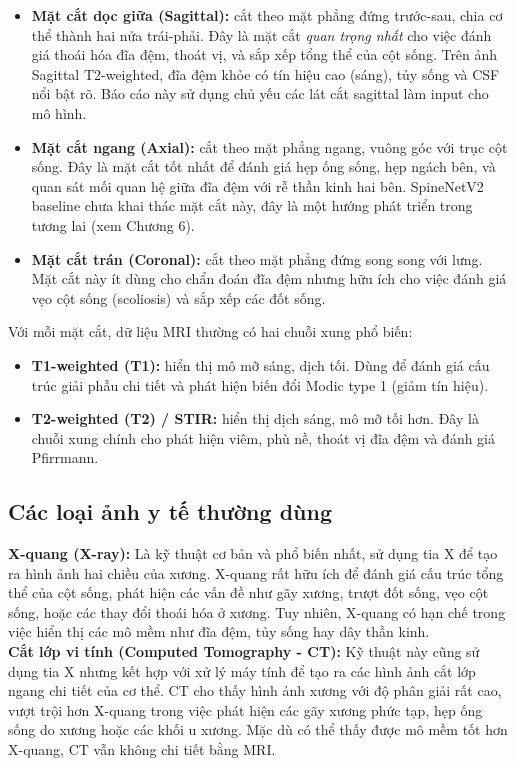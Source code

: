 \begin{itemize}
    \item \textbf{Mặt cắt dọc giữa (Sagittal):} cắt theo mặt phẳng đứng trước-sau, chia cơ thể thành hai nửa trái-phải. Đây là mặt cắt \emph{quan trọng nhất} cho việc đánh giá thoái hóa đĩa đệm, thoát vị, và sắp xếp tổng thể của cột sống. Trên ảnh Sagittal T2-weighted, đĩa đệm khỏe có tín hiệu cao (sáng), tủy sống và CSF nổi bật rõ. Báo cáo này sử dụng chủ yếu các lát cắt sagittal làm input cho mô hình.
    \item \textbf{Mặt cắt ngang (Axial):} cắt theo mặt phẳng ngang, vuông góc với trục cột sống. Đây là mặt cắt tốt nhất để đánh giá hẹp ống sống, hẹp ngách bên, và quan sát mối quan hệ giữa đĩa đệm với rễ thần kinh hai bên. SpineNetV2 baseline chưa khai thác mặt cắt này, đây là một hướng phát triển trong tương lai (xem Chương 6).
    \item \textbf{Mặt cắt trán (Coronal):} cắt theo mặt phẳng đứng song song với lưng. Mặt cắt này ít dùng cho chẩn đoán đĩa đệm nhưng hữu ích cho việc đánh giá vẹo cột sống (scoliosis) và sắp xếp các đốt sống.
\end{itemize}

Với mỗi mặt cắt, dữ liệu MRI thường có hai chuỗi xung phổ biến:
\begin{itemize}
    \item \textbf{T1-weighted (T1):} hiển thị mô mỡ sáng, dịch tối. Dùng để đánh giá cấu trúc giải phẫu chi tiết và phát hiện biến đổi Modic type 1 (giảm tín hiệu).
    \item \textbf{T2-weighted (T2) / STIR:} hiển thị dịch sáng, mô mỡ tối hơn. Đây là chuỗi xung chính cho phát hiện viêm, phù nề, thoát vị đĩa đệm và đánh giá Pfirrmann.
\end{itemize}

\subsection{Các loại ảnh y tế thường dùng}
\textbf{X-quang (X-ray):} Là kỹ thuật cơ bản và phổ biến nhất, sử dụng tia X để tạo ra hình ảnh hai chiều của xương. X-quang rất hữu ích để đánh giá cấu trúc tổng thể của cột sống, phát hiện các vấn đề như gãy xương, trượt đốt sống, vẹo cột sống, hoặc các thay đổi thoái hóa ở xương. Tuy nhiên, X-quang có hạn chế trong việc hiển thị các mô mềm như đĩa đệm, tủy sống hay dây thần kinh.\\
    
\textbf{Cắt lớp vi tính (Computed Tomography - CT):} Kỹ thuật này cũng sử dụng tia X nhưng kết hợp với xử lý máy tính để tạo ra các hình ảnh cắt lớp ngang chi tiết của cơ thể. CT cho thấy hình ảnh xương với độ phân giải rất cao, vượt trội hơn X-quang trong việc phát hiện các gãy xương phức tạp, hẹp ống sống do xương hoặc các khối u xương. Mặc dù có thể thấy được mô mềm tốt hơn X-quang, CT vẫn không chi tiết bằng MRI.\\
    
